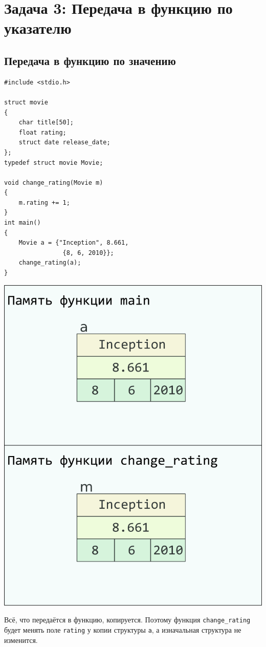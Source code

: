 \documentclass{article}
\begin{document}
\newpage
\section*{Задача 3: Передача в функцию по указателю}
\subsection*{Передача в функцию по значению}
\begin{multicols}{2}
\begin{lstlisting}
#include <stdio.h>

struct movie 
{
    char title[50];
    float rating;
    struct date release_date;
};
typedef struct movie Movie;

void change_rating(Movie m) 
{
    m.rating += 1;
}
int main() 
{
    Movie a = {"Inception", 8.661, 
                {8, 6, 2010}};
    change_rating(a);
}
\end{lstlisting}
\columnbreak
\begin{center}
\includegraphics[scale=0.86]{../images/pointer_schemes/function_by_value.png}
\end{center}
\end{multicols}
Всё, что передаётся в функцию, копируется. Поэтому функция \texttt{change\_rating} будет менять
поле \texttt{rating} у копии структуры \texttt{a}, а изначальная структура не изменится.
\end{document}
